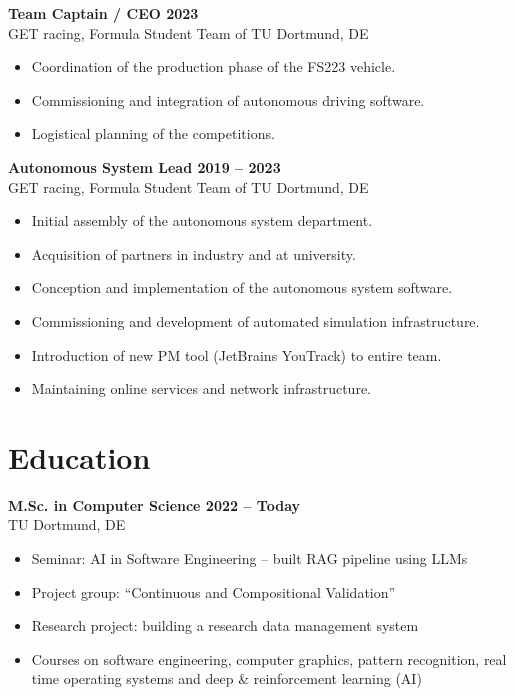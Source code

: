 \documentclass[a4paper,11pt]{article}
\newcommand{\subsectionskip}[0]{\vspace{0.125cm}}
\newcommand{\col}[2]{\textcolor[HTML]{#1}{#2}}
\begin{document}
\begin{minipage}[t]{0.65\textwidth}
    \subsectionskip

    \col{b38668}{\textbf{Team Captain / CEO \hfill 2023}} \\
    GET racing, Formula Student Team of TU Dortmund, DE
    \begin{itemize}
        \small
        \item Coordination of the production phase of the FS223 vehicle.
        \item Commissioning and integration of autonomous driving software.
        \item Logistical planning of the competitions.
    \end{itemize}

    \subsectionskip

    \textbf{\col{a68573}{Autonomous System Lead \hfill 2019 -- 2023}} \\
    GET racing, Formula Student Team of TU Dortmund, DE
    \begin{itemize}
        \small
        \item Initial assembly of the autonomous system department.
        \item Acquisition of partners in industry and at university.
        \item Conception and implementation of the autonomous system software.
        \item Commissioning and development of automated simulation infrastructure.
        \item Introduction of new PM tool (JetBrains YouTrack) to entire team.
        \item Maintaining online services and network infrastructure.
    \end{itemize}

    \section*{\col{908587}{Education}}
    \col{91878a}{\textbf{M.Sc. in Computer Science \hfill 2022 -- Today}} \\
    TU Dortmund, DE
    \begin{itemize}
        \small
        \item Seminar: AI in Software Engineering -- built RAG pipeline using LLMs
        \item Project group: \enquote{Continuous and Compositional Validation}
        \item Research project: building a research data management system
        \item Courses on software engineering, computer graphics, pattern recognition, real time operating systems and deep \& reinforcement learning (AI)
    \end{itemize}


\end{minipage}
\end{document}
